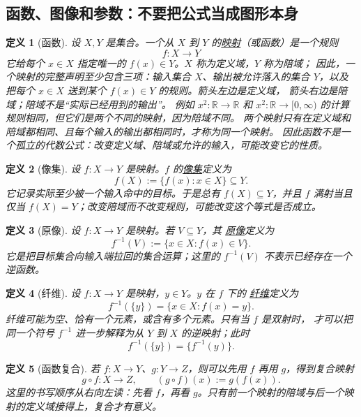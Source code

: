 \documentclass[UTF8,fontset=none,a4paper,11pt]{ctexart}
\theoremstyle{foundation-definition}
\newtheorem{definition}{定义}[section]
\theoremstyle{foundation-theorem}
\theoremstyle{foundation-proposition}
\theoremstyle{foundation-example}
\theoremstyle{foundation-remark}
\theoremstyle{foundation-theorem}
\newcommand{\term}[2]{\hyperref[#1]{#2}}
\begin{document}
\subsection{函数、图像和参数：不要把公式当成图形本身}

\begin{definition}[函数]\label{def:set-function}
设 \(X,Y\) 是集合。一个从 \(X\) 到 \(Y\) 的\term{def:set-function}{映射}（或函数）是一个规则
\[
f:X\longrightarrow Y
\]
它给每个 \(x\in X\) 指定唯一的 \(f(x)\in Y\)。\(X\) 称为定义域，\(Y\) 称为陪域；
因此，一个映射的完整声明至少包含三项：输入集合 \(X\)、输出被允许落入的集合
\(Y\)，以及把每个 \(x\in X\) 送到某个 \(f(x)\in Y\) 的规则。箭头左边是定义域，
箭头右边是陪域；陪域不是“实际已经用到的输出”。
例如 \(x^2:\mathbb R\to\mathbb R\) 和
\(x^2:\mathbb R\to[0,\infty)\) 的计算规则相同，但它们是两个不同的映射，因为陪域不同。
两个映射只有在定义域和陪域都相同、且每个输入的输出都相同时，才称为同一个映射。
因此函数不是一个孤立的代数公式：改变定义域、陪域或允许的输入，可能改变它的性质。
\end{definition}

\begin{definition}[像集]\label{def:image-set}
设 \(f:X\to Y\) 是映射。\(f\) 的\term{def:image-set}{像集}定义为
\[
f(X):=\{f(x):x\in X\}\subseteq Y.
\]
它记录实际至少被一个输入命中的目标。于是总有 \(f(X)\subseteq Y\)，并且
\(f\) 满射当且仅当 \(f(X)=Y\)；改变陪域而不改变规则，可能改变这个等式是否成立。
\end{definition}

\begin{definition}[原像]\label{def:preimage}
设 \(f:X\to Y\) 是映射。若 \(V\subseteq Y\)，其
\term{def:preimage}{原像}定义为
\[
  f^{-1}(V):=\{x\in X:f(x)\in V\}.
\]
它是把目标集合向输入端拉回的集合运算；这里的 \(f^{-1}(V)\) 不表示已经存在一个逆函数。
\end{definition}

\begin{definition}[纤维]\label{def:fiber}
设 \(f:X\to Y\) 是映射，\(y\in Y\)。\(y\) 在 \(f\) 下的
\term{def:fiber}{纤维}定义为
\[
  f^{-1}(\{y\})=\{x\in X:f(x)=y\}.
\]
纤维可能为空、恰有一个元素，或含有多个元素。只有当 \(f\) 是双射时，
才可以把同一个符号 \(f^{-1}\) 进一步解释为从 \(Y\) 到 \(X\) 的逆映射；此时
\[
  f^{-1}(\{y\})=\{f^{-1}(y)\}.
\]
\end{definition}

\begin{definition}[函数复合]\label{def:function-composition}
若 \(f:X\to Y\)、\(g:Y\to Z\)，则可以先用 \(f\) 再用 \(g\)，得到复合映射
\[
  g\circ f:X\longrightarrow Z,
  \qquad (g\circ f)(x):=g(f(x)).
\]
这里的书写顺序从右向左读：先看 \(f\)，再看 \(g\)。只有前一个映射的陪域与后一个映射的定义域接得上，复合才有意义。
\end{definition}
\end{document}
